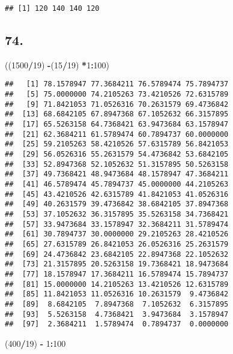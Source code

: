 \documentclass[]{article}
\newenvironment{Shaded}{\begin{snugshade}}{\end{snugshade}}
\newcommand{\DecValTok}[1]{\textcolor[rgb]{0.00,0.00,0.81}{#1}}
\newcommand{\NormalTok}[1]{#1}
\newcommand{\OperatorTok}[1]{\textcolor[rgb]{0.81,0.36,0.00}{\textbf{#1}}}
\newcommand{\StringTok}[1]{\textcolor[rgb]{0.31,0.60,0.02}{#1}}
\begin{document}
\begin{verbatim}
## [1] 120 140 140 120
\end{verbatim}

\hypertarget{section-14}{%
\subsection{74.}\label{section-14}}

\begin{Shaded}
\begin{Highlighting}[]
\NormalTok{((}\DecValTok{1500}\OperatorTok{/}\DecValTok{19}\NormalTok{) }\OperatorTok{-}\NormalTok{(}\DecValTok{15}\OperatorTok{/}\DecValTok{19}\NormalTok{) }\OperatorTok{*}\DecValTok{1}\OperatorTok{:}\DecValTok{100}\NormalTok{)}
\end{Highlighting}
\end{Shaded}

\begin{verbatim}
##   [1] 78.1578947 77.3684211 76.5789474 75.7894737
##   [5] 75.0000000 74.2105263 73.4210526 72.6315789
##   [9] 71.8421053 71.0526316 70.2631579 69.4736842
##  [13] 68.6842105 67.8947368 67.1052632 66.3157895
##  [17] 65.5263158 64.7368421 63.9473684 63.1578947
##  [21] 62.3684211 61.5789474 60.7894737 60.0000000
##  [25] 59.2105263 58.4210526 57.6315789 56.8421053
##  [29] 56.0526316 55.2631579 54.4736842 53.6842105
##  [33] 52.8947368 52.1052632 51.3157895 50.5263158
##  [37] 49.7368421 48.9473684 48.1578947 47.3684211
##  [41] 46.5789474 45.7894737 45.0000000 44.2105263
##  [45] 43.4210526 42.6315789 41.8421053 41.0526316
##  [49] 40.2631579 39.4736842 38.6842105 37.8947368
##  [53] 37.1052632 36.3157895 35.5263158 34.7368421
##  [57] 33.9473684 33.1578947 32.3684211 31.5789474
##  [61] 30.7894737 30.0000000 29.2105263 28.4210526
##  [65] 27.6315789 26.8421053 26.0526316 25.2631579
##  [69] 24.4736842 23.6842105 22.8947368 22.1052632
##  [73] 21.3157895 20.5263158 19.7368421 18.9473684
##  [77] 18.1578947 17.3684211 16.5789474 15.7894737
##  [81] 15.0000000 14.2105263 13.4210526 12.6315789
##  [85] 11.8421053 11.0526316 10.2631579  9.4736842
##  [89]  8.6842105  7.8947368  7.1052632  6.3157895
##  [93]  5.5263158  4.7368421  3.9473684  3.1578947
##  [97]  2.3684211  1.5789474  0.7894737  0.0000000
\end{verbatim}

\begin{Shaded}
\begin{Highlighting}[]
\NormalTok{(}\DecValTok{400}\OperatorTok{/}\DecValTok{19}\NormalTok{) }\OperatorTok{-}\StringTok{ }\DecValTok{1}\OperatorTok{:}\DecValTok{100}
\end{Highlighting}
\end{Shaded}
\end{document}
